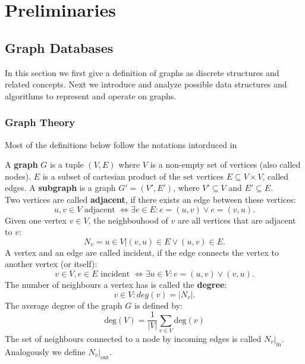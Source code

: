 \chapter{Preliminaries}\label{\positionnumber}

\section{Graph Databases
}\label{\positionnumber}
In this section we first give a definition of graphs as discrete structures and related concepts. Next we introduce and analyze possible data structures and algorithms to represent and operate on graphs. \\
        \subsection{Graph Theory}\label{\positionnumber}
            Most of the definitions below follow the notations intorduced in ~\autocite{steger2007diskrete, Gross1998GraphTA, aho1974design, cormen2009introduction, Goodrich2014AlgorithmDA}
        
            A \textbf{graph} $G$ is a tuple $(V, E)$ where $V$ is a non-empty set of vertices (also called nodes). 
            $E$ is a subset of cartesian product of the set vertices $E \subseteq V \times V$, called edges.
            A \textbf{subgraph} is a graph $G' = (V', E')$, where $V' \subseteq V$ and $E' \subseteq E$. \\
            
            Two vertices are called \textbf{adjacent}, if there exists an edge between these vertices: 
            \[ u,v \in V \text{ adjacent } \Leftrightarrow \exists e \in E: e = (u, v) \vee e= (v, u).\]
            Given one vertex $v \in V$, the neighbouhood of $v$ are all vertices that are adjacent to $v$: 
            \[N_v = {u \in V | (v, u) \in E \vee (u, v) \in E}.\] 
            A vertex and an edge are called incident, if the edge connects the vertex to another vertex (or itself): 
            \[v \in V, e\in E \text{ incident } \Leftrightarrow \exists u \in V: e = (u,v) \vee (v,u).\]
            The number of neighbours a vertex has is called the \textbf{degree}: 
            \[v \in V: deg(v) = |N_v|.\]
            The average degree of the graph $G$ is defined by:
            \[ \text{deg}(V) = \frac{1}{|V|} \sum_{v \in V}\text{deg}(v)\]
            The set of neighbours connected to a node by incoming edges is called $N_v |_\text{in}$. Analogously we define $N_v |_\text{out}$. \\
            
